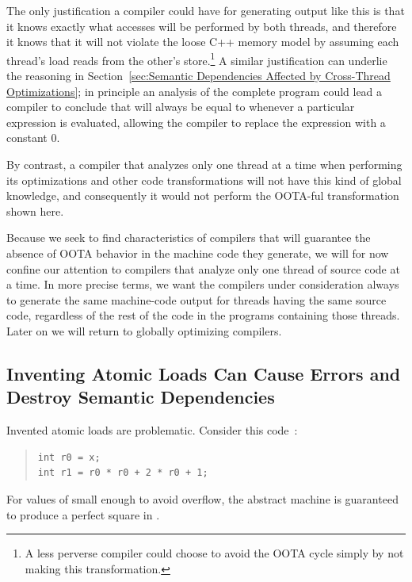 The only justification a compiler could have for generating output like
this is that it knows exactly what accesses will be performed by both
threads, and therefore it knows that it will not violate the loose C++
memory model by assuming each thread's load reads from the other's
store.\footnote{
	A less perverse compiler could choose to avoid the
	OOTA cycle simply by not making this transformation.}
A similar justification can underlie the reasoning in
Section~\ref{sec:Semantic Dependencies Affected by Cross-Thread Optimizations};
in principle an analysis of the complete program could lead a compiler
to conclude that  will always be equal to  whenever a
particular  expression is evaluated, allowing the compiler
to replace the expression with a constant 0.

By contrast, a compiler that analyzes only one thread at a time when
performing its optimizations and other code transformations will not
have this kind of global knowledge, and consequently it would not
perform the OOTA-ful transformation shown here.

Because we seek to find characteristics of compilers that will
guarantee the absence of OOTA behavior in the machine code they generate,
we will for now confine our attention to compilers that analyze only
one thread of source code at a time.
In more precise terms, we want the compilers under consideration
always to generate the same machine-code output for threads having
the same source code, regardless of the rest of the code in the programs
containing those threads.
Later on we will return to globally optimizing compilers.

\subsection{Inventing Atomic Loads Can Cause Errors and
Destroy Semantic Dependencies}
\label{sec:Inventing Atomic Loads Can Cause Errors and
Destroy Semantic Dependencies}

Invented atomic loads are problematic.
Consider this code~\cite{PaulEMcKenney2023P3046R2/OOTAwithoutTrying}:
\begin{quote}
\begin{verbatim}
int r0 = x;
int r1 = r0 * r0 + 2 * r0 + 1;
\end{verbatim}
\end{quote}
For values of  small enough to avoid overflow, the abstract machine is
guaranteed to produce a perfect square in .

